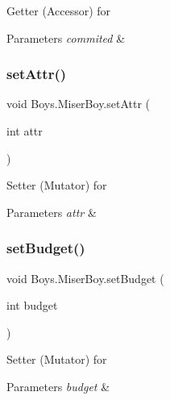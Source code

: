 Getter (Accessor) for 
\begin{DoxyParams}{Parameters}
{\em commited} & \\
\hline
\end{DoxyParams}
\mbox{\label{class_boys_1_1_miser_boy_afc3c369765c4314d7b8243c759ccbada}} 
\subsubsection{\texorpdfstring{set\+Attr()}{setAttr()}}
{\footnotesize\ttfamily void Boys.\+Miser\+Boy.\+set\+Attr (\begin{DoxyParamCaption}\item[{int}]{attr }\end{DoxyParamCaption})\hspace{0.3cm}{\ttfamily [inline]}}

Setter (Mutator) for 
\begin{DoxyParams}{Parameters}
{\em attr} & \\
\hline
\end{DoxyParams}
\mbox{\label{class_boys_1_1_miser_boy_a1eb5da28fe63ed53df27499184a8b672}} 
\subsubsection{\texorpdfstring{set\+Budget()}{setBudget()}}
{\footnotesize\ttfamily void Boys.\+Miser\+Boy.\+set\+Budget (\begin{DoxyParamCaption}\item[{int}]{budget }\end{DoxyParamCaption})\hspace{0.3cm}{\ttfamily [inline]}}

Setter (Mutator) for 
\begin{DoxyParams}{Parameters}
{\em budget} & \\
\hline
\end{DoxyParams}
\mbox{\label{class_boys_1_1_miser_boy_a0e23e7996f136be4abe259e142d531b6}} 
